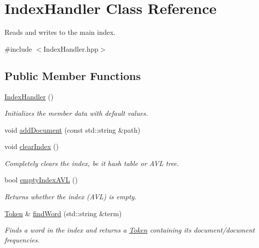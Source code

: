 \hypertarget{class_index_handler}{}\section{Index\+Handler Class Reference}
\label{class_index_handler}


Reads and writes to the main index.  




{\ttfamily \#include $<$Index\+Handler.\+hpp$>$}

\subsection*{Public Member Functions}
\begin{DoxyCompactItemize}
\item 
\hyperlink{class_index_handler_a27748387661142a2eb545be6f0499996}{Index\+Handler} ()
\begin{DoxyCompactList}\small\item\em Initializes the member data with default values. \end{DoxyCompactList}\item 
void \hyperlink{class_index_handler_a59b96a28cc87ee0ee4e9e36b021952b0}{add\+Document} (const std\+::string \&path)
\item 
void \hyperlink{class_index_handler_a6bf96d298c05a661245313a44d65d109}{clear\+Index} ()
\begin{DoxyCompactList}\small\item\em Completely clears the index, be it hash table or A\+V\+L tree. \end{DoxyCompactList}\item 
bool \hyperlink{class_index_handler_a5b9c45db93955ffa813bb3467e253f66}{empty\+Index\+A\+V\+L} ()
\begin{DoxyCompactList}\small\item\em Returns whether the index (A\+V\+L) is empty. \end{DoxyCompactList}\item 
\hyperlink{class_token}{Token} \& \hyperlink{class_index_handler_af1b5de0f985fe2b203e337baf6aa3bd2}{find\+Word} (std\+::string \&term)
\begin{DoxyCompactList}\small\item\em Finds a word in the index and returns a \hyperlink{class_token}{Token} containing its document/document frequencies. \end{DoxyCompactList}\item 

\end{DoxyCompactItemize}
